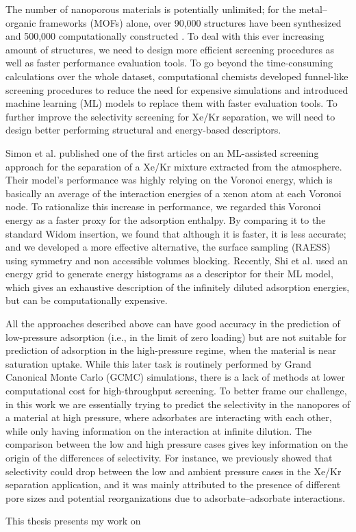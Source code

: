 The number of nanoporous materials is potentially unlimited; for the metal--organic frameworks (MOFs) alone, over 90,000 structures have been synthesized \cite{Groom_2016} and 500,000 computationally constructed \cite{Wilmer_2011,Boyd_2016,Colon_2017}. To deal with this ever increasing amount of structures, we need to design more efficient screening procedures as well as faster performance evaluation tools. To go beyond the time-consuming calculations over the whole dataset, computational chemists developed funnel-like screening procedures to reduce the need for expensive simulations and introduced machine learning (ML) models to replace them with faster evaluation tools.\cite{Ren_2022} To further improve the selectivity screening for Xe/Kr separation, we will need to design better performing structural and energy-based descriptors.

Simon et al. published one of the first articles on an ML-assisted screening approach for the separation of a Xe/Kr mixture extracted from the atmosphere.\cite{Simon_2015} Their model's performance was highly relying on the Voronoi energy, which is basically an average of the interaction energies of a xenon atom at each Voronoi node.\cite{Rycroft_2009} To rationalize this increase in performance, we regarded this Voronoi energy as a faster proxy for the adsorption enthalpy. By comparing it to the standard Widom insertion, we found that although it is faster, it is less accurate; and we developed a more effective alternative, the surface sampling (RAESS) using symmetry and non accessible volumes blocking.\cite{Ren_2023} Recently, Shi et al. used an energy grid to generate energy histograms as a descriptor for their ML model, which gives an exhaustive description of the infinitely diluted adsorption energies,\cite{Shi_2023} but can be computationally expensive.

All the approaches described above can have good accuracy in the prediction of low-pressure adsorption (i.e., in the limit of zero loading) but are not suitable for prediction of adsorption in the high-pressure regime, when the material is near saturation uptake. While this later task is routinely performed by Grand Canonical Monte Carlo (GCMC) simulations, there is a lack of methods at lower computational cost for high-throughput screening. To better frame our challenge, in this work we are essentially trying to predict the selectivity in the nanopores of a material at high pressure, where adsorbates are interacting with each other, while only having information on the interaction at infinite dilution. The comparison between the low and high pressure cases gives key information on the origin of the differences of selectivity. For instance, we previously showed that selectivity could drop between the low and ambient pressure cases in the Xe/Kr separation application, and it was mainly attributed to the presence of different pore sizes and potential reorganizations due to adsorbate--adsorbate interactions.\cite{Ren_2021}


\begin{center}
\end{center}

This thesis presents my work on 




\vfill
\begin{center}
\end{center}
\vfill\vfill
